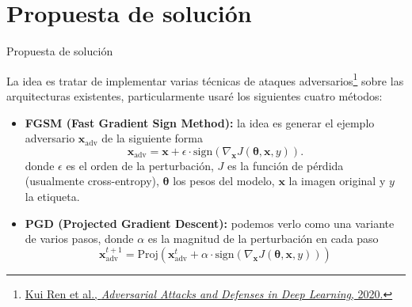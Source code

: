 \documentclass[10pt]{beamer}
\begin{document}
\section{Propuesta de solución}
\begin{frame}{Propuesta de solución}
\justify	
\small

La idea es tratar de implementar varias técnicas de ataques adversarios\footnote{\vspace*{0.3cm} \href{https://reader.elsevier.com/reader/sd/pii/S209580991930503X?token=D051F74ED28FC5C7871D901893E9DAA76D35478F8C374211EC76DA66B1D71487CCB669164F543A5F3A04AE89239AC6C9&originRegion=us-east-1&originCreation=20210425231353}{Kui Ren et al., \emph{Adversarial Attacks and Defenses in Deep Learning}, 2020.}} sobre las arquitecturas existentes, particularmente usaré los siguientes cuatro métodos: 

\begin{itemize}
\item \textbf{FGSM (Fast Gradient Sign Method):} la idea es generar el ejemplo adversario $\bm{x}_{\text{adv}}$ de la siguiente forma
%
\[ \bm{x}_{\text{adv}} = \bm{x} + \epsilon \cdot \text{sign}\left( \nabla_{\bm{x}} J(\bm{\theta}, \bm{x}, y) \right). \]
%
donde $\epsilon$ es el orden de la perturbación, $J$ es la función de pérdida (usualmente cross-entropy), $\bm{\theta}$ los pesos del modelo, $\bm{x}$ la imagen original y $y$ la etiqueta.

\item \textbf{PGD (Projected Gradient Descent):} podemos verlo como una variante de varios pasos, donde $\alpha$ es la magnitud de la perturbación en cada paso
%
\[ \bm{x}_{\text{adv}}^{t+1} = \text{Proj}\left( \bm{x}_{\text{adv}}^{t} + \alpha \cdot  \text{sign}\left( \nabla_{\bm{x}} J(\bm{\theta}, \bm{x}, y) \right) \right) \]
\end{itemize}

\end{frame}
\end{document}
